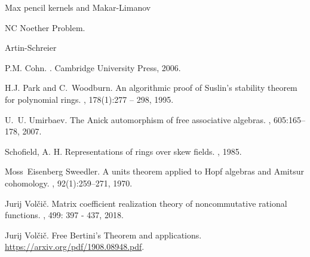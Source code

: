 Max pencil kernels and Makar-Limanov

NC Noether Problem.

Artin-Schreier










\begin{thebibliography}{6}

P.M. Cohn.
.
\newblock Cambridge University Press, 2006.


H.J. Park and C.~Woodburn.
\newblock An algorithmic proof of {S}uslin's stability theorem for polynomial
  rings.
, 178(1):277 -- 298, 1995.

U.~U. Umirbaev.
\newblock The {A}nick automorphism of free associative algebras.
, 605:165--178, 2007.


Schofield, A. H.
\newblock Representations of rings over skew fields.
, 1985.


Moss~Eisenberg Sweedler.
\newblock A units theorem applied to {H}opf algebras and {A}mitsur cohomology.
, 92(1):259--271, 1970.



Jurij Vol{\v c}i{\v c}.
\newblock Matrix coefficient realization theory of noncommutative rational functions.
, 499: 397 - 437, 2018.

Jurij Vol{\v c}i{\v c}.
\newblock Free Bertini's Theorem and applications.
\newblock \url{https://arxiv.org/pdf/1908.08948.pdf}.


\end{thebibliography}


